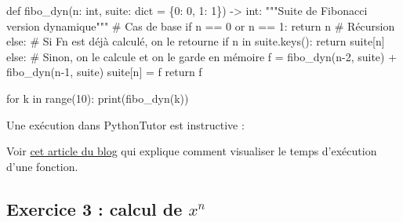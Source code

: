 \documentclass[
  letterpaper,
  DIV=11,
  numbers=noendperiod]{scrartcl}
\newenvironment{Shaded}{\begin{snugshade}}{\end{snugshade}}
\newcommand{\BuiltInTok}[1]{\textcolor[rgb]{0.00,0.23,0.31}{#1}}
\newcommand{\CommentTok}[1]{\textcolor[rgb]{0.37,0.37,0.37}{#1}}
\newcommand{\ControlFlowTok}[1]{\textcolor[rgb]{0.00,0.23,0.31}{#1}}
\newcommand{\DecValTok}[1]{\textcolor[rgb]{0.68,0.00,0.00}{#1}}
\newcommand{\KeywordTok}[1]{\textcolor[rgb]{0.00,0.23,0.31}{#1}}
\newcommand{\NormalTok}[1]{\textcolor[rgb]{0.00,0.23,0.31}{#1}}
\newcommand{\OperatorTok}[1]{\textcolor[rgb]{0.37,0.37,0.37}{#1}}
\begin{document}
\begin{tcolorbox}
\begin{Shaded}
\begin{Highlighting}[]
\KeywordTok{def}\NormalTok{ fibo\_dyn(n: }\BuiltInTok{int}\NormalTok{, suite: }\BuiltInTok{dict} \OperatorTok{=}\NormalTok{ \{}\DecValTok{0}\NormalTok{: }\DecValTok{0}\NormalTok{, }\DecValTok{1}\NormalTok{: }\DecValTok{1}\NormalTok{\}) }\OperatorTok{{-}\textgreater{}} \BuiltInTok{int}\NormalTok{:}
    \CommentTok{"""Suite de Fibonacci version dynamique"""}
    \CommentTok{\# Cas de base}
    \ControlFlowTok{if}\NormalTok{ n }\OperatorTok{==} \DecValTok{0} \KeywordTok{or}\NormalTok{ n }\OperatorTok{==} \DecValTok{1}\NormalTok{:}
        \ControlFlowTok{return}\NormalTok{ n}
    \CommentTok{\# Récursion}
    \ControlFlowTok{else}\NormalTok{:}
        \CommentTok{\# Si Fn est déjà calculé, on le retourne}
        \ControlFlowTok{if}\NormalTok{ n }\KeywordTok{in}\NormalTok{ suite.keys():}
            \ControlFlowTok{return}\NormalTok{ suite[n]}
        \ControlFlowTok{else}\NormalTok{:}
            \CommentTok{\# Sinon, on le calcule et on le garde en mémoire}
\NormalTok{            f }\OperatorTok{=}\NormalTok{ fibo\_dyn(n}\OperatorTok{{-}}\DecValTok{2}\NormalTok{, suite) }\OperatorTok{+}\NormalTok{ fibo\_dyn(n}\OperatorTok{{-}}\DecValTok{1}\NormalTok{, suite)}
\NormalTok{            suite[n] }\OperatorTok{=}\NormalTok{ f}
            \ControlFlowTok{return}\NormalTok{ f}


\ControlFlowTok{for}\NormalTok{ k }\KeywordTok{in} \BuiltInTok{range}\NormalTok{(}\DecValTok{10}\NormalTok{):}
    \BuiltInTok{print}\NormalTok{(fibo\_dyn(k))}
\end{Highlighting}
\end{Shaded}

Une exécution dans PythonTutor est instructive :

Voir
\href{https://www.flallemand.fr/wp/2022/06/05/mesurer-le-temps-dexecution-dun-fragment-de-code/}{cet
article du blog} qui explique comment visualiser le temps d'exécution
d'une fonction.

\end{tcolorbox}

\hypertarget{fa-solid-pencil-alt-fa-desktop-exercice-3-calcul-de-xn}{%
\subsection{\texorpdfstring{ 
Exercice 3 : calcul de
\(x^n\)}{  Exercice 3 : calcul de x\^{}n}}\label{fa-solid-pencil-alt-fa-desktop-exercice-3-calcul-de-xn}}
\end{document}
